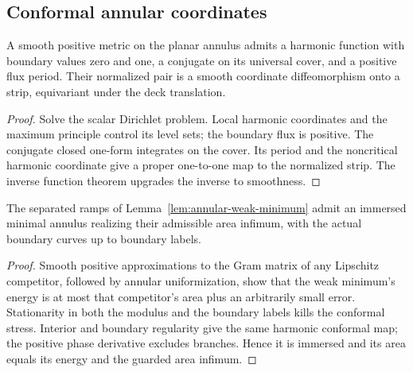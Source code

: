\subsection{Conformal annular coordinates}
\label{sec:annular-uniformization}

\begin{lemma}\label{lem:annular-uniformization}
A smooth positive metric on the planar annulus admits a harmonic
function with boundary values zero and one, a conjugate on its
universal cover, and a positive flux period. Their normalized pair
is a smooth coordinate diffeomorphism onto a strip, equivariant
under the deck translation.
\end{lemma}
\begin{proof}
Solve the scalar Dirichlet problem. Local harmonic coordinates and
the maximum principle control its level sets; the boundary flux is
positive. The conjugate closed one-form integrates on the cover.
Its period and the noncritical harmonic coordinate give a proper
one-to-one map to the normalized strip. The inverse function theorem
upgrades the inverse to smoothness.
\end{proof}

\begin{lemma}
\label{lem:annular-immersed-minimum}
The separated ramps of Lemma~\ref{lem:annular-weak-minimum}
admit an immersed minimal annulus realizing their admissible area
infimum, with the actual boundary curves up to boundary labels.
\end{lemma}
\begin{proof}
Smooth positive approximations to the Gram matrix of any Lipschitz
competitor, followed by annular uniformization, show that the weak
minimum's energy is at most that competitor's area plus an
arbitrarily small error. Stationarity in both the modulus and the
boundary labels kills the conformal stress. Interior and boundary
regularity give the same harmonic conformal map; the positive
phase derivative excludes branches. Hence it is immersed and its
area equals its energy and the guarded area infimum.
\end{proof}

